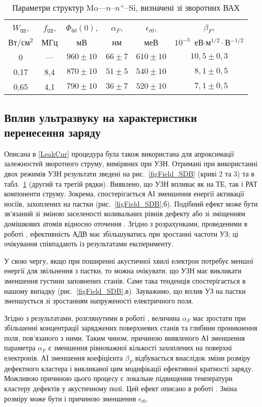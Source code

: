 \begin{table}
\caption{Параметри структур Mo---$n$--$n^+$--Si, визначені зі зворотних ВАХ}
\label{tabSDBParZv}
\centering
\begin{tabular}{|c|c|c|c|c|c|}
\hline
$W_\mathtt{US}$, &$f_\mathtt{US}$,&$\Phi_{b0}(0)$,&$\alpha_F$,&$\epsilon_{t0}$,&$\beta_F$,\\
Вт/см$^2$&МГц&мВ&нм&меВ&$10^{-5}$~еВ$\cdot$м$^{1/2}\cdot$В$^{-1/2}$\\\hline
0&---&$960\pm10$&$66\pm7$&$610\pm10$&$10,5\pm0,3$\\\hline
0,17&8,4&$870\pm10$&$51\pm5$&$540\pm10$&$\;\:8,1\pm0,5$\\\hline
0,65&4,1&$790\pm10$&$36\pm7$&$520\pm10$&$\;\:7,1\pm0,5$\\\hline
\end{tabular}
\end{table}



\subsection{Вплив ультразвуку на характеристики перенесення заряду}

Описана в \ref{LeakCur} процедура була також використана для апроксимації залежностей зворотного струму, виміряних при УЗН.
Отримані при використанні двох режимів УЗН результати зведені на рис.~\ref{figField_SDB} (криві 2 та 3) та в табл.~\ref{tabSDBParZv} (другий та третій рядки).
Виявлено, що УЗН впливає як на ТЕ, так і РАТ компоненти струму.
Зокрема, спостерігається АІ зменшення енергії активації носіїв, захоплених на пастки (рис.~\ref{figField_SDB},б).
Подібний ефект може бути зв'язаний зі зміною заселеності коливальних рівнів дефекту \cite{Pavlovich} або зі зміщенням домішкових
атомів відносно оточення \cite{Korotchenkov1995}.
Згідно з розрахунками, проведеними в роботі \cite{Pavlovich}, ефективність АДВ має збільшуватись при зростанні частоти УЗ;
ці очікування співпадають із результатами експерименту.

У свою чергу, якщо при поширенні акустичної хвилі електрон потребує меншої енергії для звільнення з пастки,
то можна очікувати, що УЗН має викликати зменшення густини заповнених станів.
Саме така тенденція спостерігається в нашому випадку (рис.~\ref{figField_SDB},в).
Зауважимо, що вплив УЗ на пастки зменшується зі зростанням напруженості електричного поля.

Згідно з результатами, розглянутими в роботі \cite{Em:Parker},
величина $\alpha_F$ має зростати при збільшенні концентрації заряджених поверхневих станів та
глибини проникнення поля, пов'язаного  з ними.
Таким чином, причиною виявленого АІ
зменшення параметра $\alpha_F$ є зменшення рівноважної кількості захоплених на поверхні електронів.
АІ зменшення коефіцієнта $\beta_F$ відбувається внаслідок зміни розміру дефектного кластера і викликаної цим
модифікації ефективної кратності заряду.
Можливою причиною цього процесу є локальне підвищення температури кластеру дефектів у акустичному полі.
Цей ефект описано в роботі \cite{MirzadeJAP2011}.
Зміна розміру може бути і причиною зменшення $\epsilon_{t0}$.

